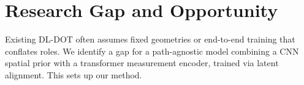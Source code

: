 
\section{Research Gap and Opportunity}

Existing DL-DOT often assumes fixed geometries or end-to-end training that conflates roles. We identify a gap for a path-agnostic model combining a CNN spatial prior with a transformer measurement encoder, trained via latent alignment. This sets up our method.


